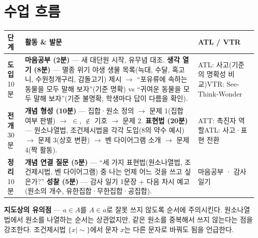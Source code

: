 \documentclass[11pt,a4paper]{article}
\begin{document}
\section{수업 흐름}
\begin{tabularx}{\linewidth}{@{}>{\centering\arraybackslash}p{1.6cm}X>{\raggedright\arraybackslash\small}p{3.1cm}@{}}
\toprule
\textbf{단계} & \textbf{활동 \& 발문} & \textbf{ATL / VTR} \\
\midrule
\textcolor{goldstrong}{\textbf{도입}}\newline\footnotesize 10분 &
\textbf{마음공부 (2분)} --- 새 대단원 시작, 유무념 대조.\newline
\textbf{생각 열기 (8분)} --- 멸종 위기 야생 생물 목록(늑대, 수달, 혹고니, 수원청개구리, 감돌고기) 제시 $\to$ ``포유류에 속하는 동물을 모두 말해 보자''(기준 명확) vs ``귀여운 동물을 모두 말해 보자''(기준 불명확, 학생마다 답이 다름을 확인). &
ATL: 사고(기준의 명확성 비교)\newline VTR: See-Think-Wonder \\
\addlinespace
\textcolor{goldstrong}{\textbf{전개}}\newline\footnotesize 30분 &
\textbf{개념 형성 (10분)} --- 집합·원소 정의 $\to$ 문제 1(집합 여부 판별) $\to$ $\in$, $\notin$ 기호 $\to$ 문제 2.\newline
\textbf{표현법 (20분)} --- 원소나열법, 조건제시법을 각각 도입(8의 약수 예시) $\to$ 문제 3(상호 변환) $\to$ 벤 다이어그램 소개 $\to$ 문제 4(짝 활동). &
ATT: 촉진자 역할\newline ATL: 사고·표현 전환 \\
\addlinespace
\textcolor{goldstrong}{\textbf{정리}}\newline\footnotesize 10분 &
\textbf{개념 연결 질문 (5분)} --- ``세 가지 표현법(원소나열법, 조건제시법, 벤 다이어그램) 중 나는 언제 어느 것을 쓰고 싶은가?''\newline
\textbf{성찰 (5분)} --- 감사 일기 1문장 + 다음 차시 예고(원소의 개수, 유한집합·무한집합·공집합). &
마음공부 · 감사 일기 \\
\bottomrule
\end{tabularx}

\begin{calloutbox}
\textbf{지도상의 유의점} --- $a\in A$를 $A\in a$로 잘못 쓰지 않도록 순서에 주의시킨다. 원소나열법에서 원소를 나열하는 순서는 상관없지만, 같은 원소를 중복해서 쓰지 않는다는 점을 강조한다. 조건제시법 $\{x\mid \sim\}$에서 문자 $x$는 다른 문자로 바꿔도 됨을 언급한다.
\end{calloutbox}
\end{document}
